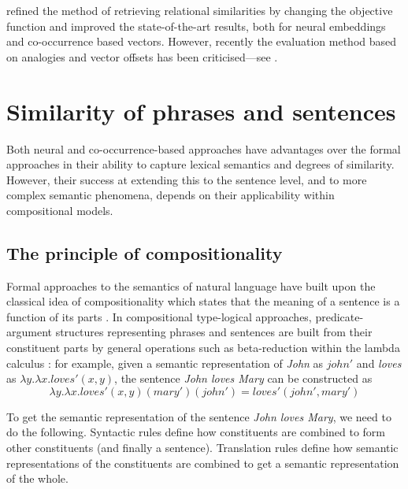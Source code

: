  refined the method of retrieving relational similarities by changing the objective function and improved the state-of-the-art results, both for neural embeddings and co-occurrence based vectors. However, recently the evaluation method based on analogies and vector offsets has been criticised---see .

\section{Similarity of phrases and sentences}
\label{sec:similarity-compounds}

Both neural and co-occurrence-based approaches have advantages over the formal approaches in their ability to capture lexical semantics and degrees of similarity. However, their success at extending this to the sentence level, and to more complex semantic phenomena, depends on their applicability within compositional models.

\subsection{The principle of compositionality}
\label{sec:formal-semantics}

Formal approaches to the semantics of natural language have built upon the
classical idea of compositionality which states that the meaning of a sentence is a
function of its parts \cite{Janssen2001}. In compositional type-logical
approaches, predicate-argument structures representing phrases and sentences are
built from their constituent parts by general operations such as beta-reduction
within the lambda calculus \cite{THEO:THEO373}: for example, given a semantic
representation of \emph{John} as $\mathit{john}'$ and \emph{loves} as
$\lambda y.\lambda x.\mathit{loves}'(x, y)$, the sentence \emph{John loves Mary}
can be constructed as
$$
\lambda y.\lambda
x.\mathit{loves}'(x, y)(\mathit{mary}')(\mathit{john}') =
\mathit{loves}'(\mathit{john}', \mathit{mary}')
$$

To get the semantic representation of the sentence \textit{John loves Mary}, we
need to do the following. Syntactic rules define how constituents are combined
%
%
%
to form other constituents (and finally a sentence). Translation rules define
how semantic representations of the constituents are combined to get a semantic
representation of the whole.

